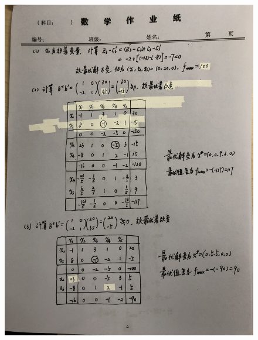 \documentclass[a4paper]{article}
\begin{document}
\begin{figure}[htbp]
	\centering
	\includegraphics[height=23cm]{5.JPG}
\end{figure}
\end{document}
